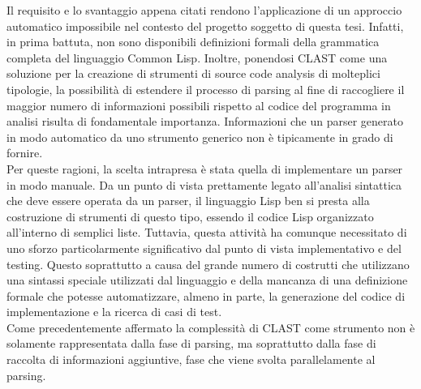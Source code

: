 Il requisito e lo svantaggio appena citati rendono l’applicazione di un
approccio automatico impossibile nel contesto del progetto soggetto di questa
tesi. Infatti, in prima battuta, non sono disponibili definizioni formali
della grammatica completa del linguaggio Common Lisp. Inoltre, ponendosi CLAST
come una soluzione per la creazione di strumenti di source code analysis di
molteplici tipologie, la possibilità di estendere il processo di parsing al
fine di raccogliere il maggior numero di informazioni possibili rispetto al
codice del programma in analisi risulta di fondamentale importanza.
Informazioni che un parser generato in modo automatico da uno strumento
generico non è tipicamente in grado di fornire.\\

Per queste ragioni, la scelta intrapresa è stata quella di implementare un
parser in modo manuale. Da un punto di vista prettamente legato all’analisi
sintattica che deve essere operata da un parser, il linguaggio Lisp ben si
presta alla costruzione di strumenti di questo tipo, essendo il codice Lisp
organizzato all’interno di semplici liste. Tuttavia, questa attività ha
comunque necessitato di uno sforzo particolarmente significativo dal punto di
vista implementativo e del testing. Questo soprattutto a causa del grande
numero di costrutti che utilizzano una sintassi speciale utilizzati dal
linguaggio e della mancanza di una definizione formale che potesse
automatizzare, almeno in parte, la generazione del codice di implementazione e
la ricerca di casi di test.\\

Come precedentemente affermato la complessità di CLAST come strumento non è
solamente rappresentata dalla fase di parsing, ma soprattutto dalla fase di
raccolta di informazioni aggiuntive, fase che viene svolta parallelamente al
parsing.


